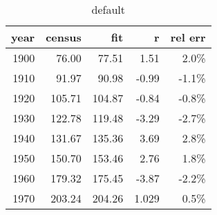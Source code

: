 \begin{table}[t]
	\begin{center}
		\begin{tabular}{rrrrr}
		 year & census & fit & r & rel err\\\hline
		 1900 & 76.00  & 77.51  & 1.51  & 2.0\% \\
		 1910 & 91.97  & 90.98  & -0.99 & -1.1\% \\
		 1920 & 105.71 & 104.87 & -0.84 & -0.8\% \\
		 1930 & 122.78 & 119.48 & -3.29 & -2.7\% \\
		 1940 & 131.67 & 135.36 & 3.69  & 2.8\% \\
		 1950 & 150.70 & 153.46 & 2.76  & 1.8\% \\
		 1960 & 179.32 & 175.45 & -3.87 & -2.2\% \\
		 1970 & 203.24 & 204.26 & 1.029 & 0.5\% \\
		\end{tabular}
	\end{center}
	\caption{default}
\end{table}%

\endinput  %

